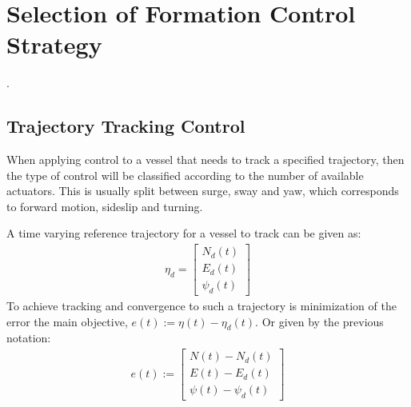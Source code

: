 \chapter{Selection of Formation Control Strategy}
\label{ch:selformctrl}

.

\section{Trajectory Tracking Control}
When applying control to a vessel that needs to track a specified trajectory, then the type of control will be classified according to the number of available actuators. This is usually split between surge, sway and yaw, which corresponds to forward motion, sideslip and turning.

A time varying reference trajectory for a vessel to track can be given as:
\begin{align}
\eta_d=
\begin{bmatrix}
N_d(t)\\
E_d(t)\\
\psi_d(t)
\end{bmatrix}
\end{align}
To achieve tracking and convergence to such a trajectory is minimization of the error the main objective, $e(t):=\eta(t)-\eta_d(t)$. Or given by the previous notation:
\begin{align}
e(t):=
\begin{bmatrix}
N(t)-N_d(t)\\
E(t)-E_d(t)\\
\psi(t)-\psi_d(t)
\end{bmatrix}
\end{align}

